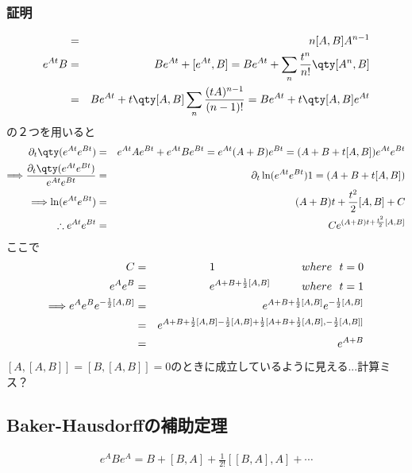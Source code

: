 \documentclass[10.5pt,a4paper]{jreport}
\begin{document}
\subsubsection{証明}
\begin{eqnarray}
  [A^n, B] &=& n[A, B]A^{n-1}\\
  \nonumber  e^{At}B &=& Be^{At} + [e^{At}, B] = Be^{At} + \sum_n\frac{t^n}{n!}\qty[A^n, B]\\
  &=& Be^{At} + t\qty[A, B]\sum_n\frac{(tA)^{n-1}}{(n-1)!} = Be^{At} + t\qty[A, B]e^{At}
\end{eqnarray}
の２つを用いると
\begin{eqnarray}
  \partial_t\qty(e^{At}e^{Bt}) &=& e^{At}Ae^{Bt} + e^{At}Be^{Bt} = e^{At}(A+B)e^{Bt} = (A+B+t[A, B])e^{At}e^{Bt}\\
  \Longrightarrow \frac{\partial_t\qty(e^{At}e^{Bt})}{e^{At}e^{Bt}} &=& \partial_t\ln(e^{At}e^{Bt}) 1= (A+B+t[A, B])\\
  \Longrightarrow  \ln(e^{At}e^{Bt}) &=& (A+B)t + \frac{t^2}{2}[A, B] + C\\
  \therefore e^{At}e^{Bt} &=& Ce^{(A+B)t + \frac{t^2}{2}[A, B]}
\end{eqnarray}
ここで
\begin{eqnarray}
  C &=& 1\hspace{2.75cm} where\ \ t = 0\\
  e^Ae^B &=& e^{A+B+\frac{1}{2}[A, B]}\hspace{1cm} where\ \ t = 1\\
  \nonumber \Longrightarrow e^Ae^Be^{-\frac{1}{2}[A, B]} &=& e^{A+B+\frac{1}{2}[A, B]}e^{-\frac{1}{2}[A, B]}\\
  \nonumber  &=& e^{A+B+\frac{1}{2}[A, B]-\frac{1}{2}[A, B] + \frac{1}{2}[A+B+\frac{1}{2}[A, B], -\frac{1}{2}[A, B]]}\\
  &=&e^{A+B}
\end{eqnarray}
$[A, [A, B]] = [B, [A, B]] = 0$のときに成立しているように見える...計算ミス？
\subsection{Baker-Hausdorffの補助定理}
\begin{screen}
  \begin{eqnarray}
    e^ABe^A = B + [B, A] + \frac{1}{2!}[[B, A], A] + \cdots
  \end{eqnarray}
\end{screen}
\end{document}
